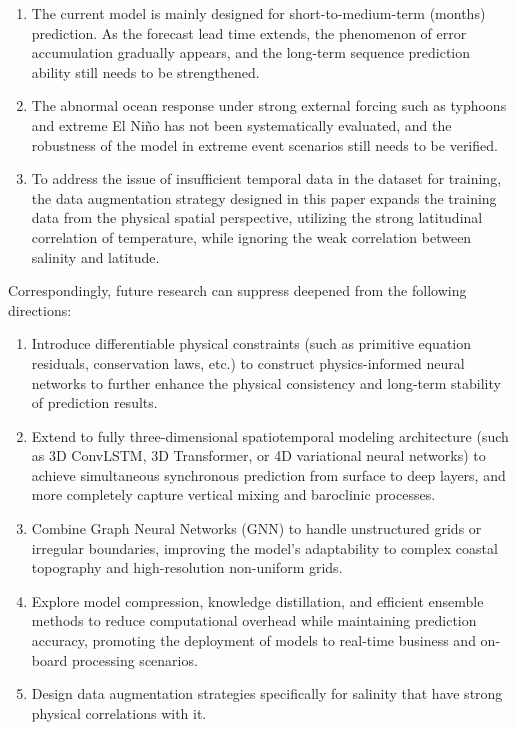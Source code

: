 \documentclass[webpdf,contemporary,large]{oup-authoring-template}
\begin{document}
\begin{enumerate}
\renewcommand{\labelenumi}{\alph{enumi})}
\item The current model is mainly designed for short-to-medium-term (months) prediction. As the forecast lead time extends, the phenomenon of error accumulation gradually appears, and the long-term sequence prediction ability still needs to be strengthened.

\item The abnormal ocean response under strong external forcing such as typhoons and extreme El Niño has not been systematically evaluated, and the robustness of the model in extreme event scenarios still needs to be verified.

\item To address the issue of insufficient temporal data in the dataset for training, the data augmentation strategy designed in this paper expands the training data from the physical spatial perspective, utilizing the strong latitudinal correlation of temperature, while ignoring the weak correlation between salinity and latitude.
\end{enumerate}

Correspondingly, future research can suppress deepened from the following directions:

\begin{enumerate}
\renewcommand{\labelenumi}{\alph{enumi})}
\item Introduce differentiable physical constraints (such as primitive equation residuals, conservation laws, etc.) to construct physics-informed neural networks to further enhance the physical consistency and long-term stability of prediction results.

\item Extend to fully three-dimensional spatiotemporal modeling architecture (such as 3D ConvLSTM, 3D Transformer, or 4D variational neural networks) to achieve simultaneous synchronous prediction from surface to deep layers, and more completely capture vertical mixing and baroclinic processes.

\item Combine Graph Neural Networks (GNN) to handle unstructured grids or irregular boundaries, improving the model's adaptability to complex coastal topography and high-resolution non-uniform grids.

\item Explore model compression, knowledge distillation, and efficient ensemble methods to reduce computational overhead while maintaining prediction accuracy, promoting the deployment of models to real-time business and on-board processing scenarios.

\item Design data augmentation strategies specifically for salinity that have strong physical correlations with it.
\end{enumerate}
\end{document}
